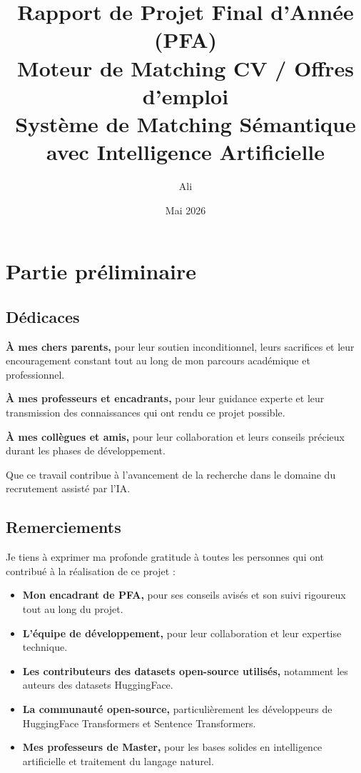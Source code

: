 \documentclass[12pt,a4paper]{report}
\title{Rapport de Projet Final d'Année (PFA) \\ \color{primarygreen}Moteur de Matching CV / Offres d'emploi \\ \color{darkgreen}Système de Matching Sémantique avec Intelligence Artificielle}
\author{\color{primarygreen}Ali}
\date{\color{darkgreen}Mai 2026}
\begin{document}
\maketitle
\thispagestyle{empty}
\newpage

\tableofcontents
\newpage

\listoffigures
\newpage

\listoftables
\newpage

\part{Partie préliminaire}

\chapter{Dédicaces}
\label{chap:dedicaces}

{\color{primarygreen}\large\textbf{À mes chers parents,}} pour leur soutien inconditionnel, leurs sacrifices et leur encouragement constant tout au long de mon parcours académique et professionnel.

{\color{darkgreen}\large\textbf{À mes professeurs et encadrants,}} pour leur guidance experte et leur transmission des connaissances qui ont rendu ce projet possible.

{\color{primarygreen}\large\textbf{À mes collègues et amis,}} pour leur collaboration et leurs conseils précieux durant les phases de développement.

Que ce travail contribue à l'avancement de la recherche dans le domaine du recrutement assisté par l'IA.

\chapter{Remerciements}
\label{chap:remerciements}

Je tiens à exprimer ma profonde gratitude à toutes les personnes qui ont contribué à la réalisation de ce projet :

\begin{itemize}
\item {\color{primarygreen}\textbf{Mon encadrant de PFA,}} pour ses conseils avisés et son suivi rigoureux tout au long du projet.
\item {\color{darkgreen}\textbf{L'équipe de développement,}} pour leur collaboration et leur expertise technique.
\item {\color{primarygreen}\textbf{Les contributeurs des datasets open-source utilisés,}} notamment les auteurs des datasets HuggingFace.
\item {\color{darkgreen}\textbf{La communauté open-source,}} particulièrement les développeurs de HuggingFace Transformers et Sentence Transformers.
\item {\color{primarygreen}\textbf{Mes professeurs de Master,}} pour les bases solides en intelligence artificielle et traitement du langage naturel.
\end{itemize}
\end{document}
